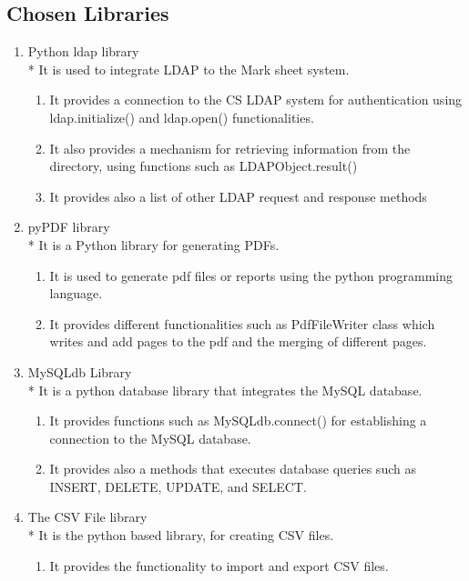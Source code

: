 \documentclass[12pt]{article}
\begin{document}
		
		\subsection{Chosen Libraries}
                \begin{enumerate}
					\item Python ldap library \\*
					It is used to integrate LDAP to the Mark sheet system.
						\begin{enumerate}
							\item It provides  a connection to the CS LDAP system for authentication using ldap.initialize() and ldap.open() functionalities.
							\item It also provides a mechanism for retrieving information from the directory, using functions such as LDAPObject.result()
							\item It provides also a list of other LDAP request and response methods
						\end{enumerate}
					\item pyPDF library \\*
					It is a Python library for generating PDFs.
						\begin{enumerate}
							\item It is used to generate pdf files or reports using the python programming language.
							\item It provides different functionalities such as PdfFileWriter class which writes and add pages to the pdf and the merging of different pages.
						\end{enumerate}
					\item MySQLdb Library \\*
					It is a python database library that integrates the MySQL database.
						\begin{enumerate}
							\item It provides functions such as MySQLdb.connect()  for establishing a connection to the MySQL database.
							\item It provides also a methods that executes database queries such as INSERT, DELETE, UPDATE, and SELECT.
						\end{enumerate}
					\item The CSV File library \\*
					It is the python based library, for creating CSV files.
						\begin{enumerate}
							\item It provides the functionality to import and export CSV files.
						\end{enumerate}
				\end{enumerate}
			\vspace{0.2in}
\end{document}
